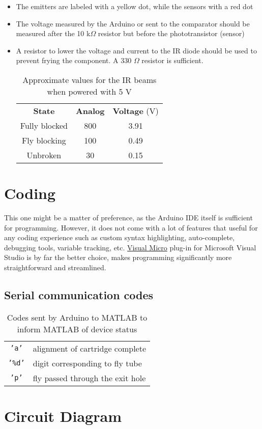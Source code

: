 \documentclass[12pt]{article}
\begin{document}
\begin{itemize}
	\item The emitters are labeled with a yellow dot, while the sensors with a red dot
	\item The voltage measured by the Arduino or sent to the comparator should be measured after the 10 k$\Omega$ resistor but before the phototransistor (sensor)
	\item A resistor to lower the voltage and current to the IR diode should be used to prevent frying the component. A 330 $\Omega$ resistor is sufficient.
	\begin{table}[H]
		\centering
		\begin{tabular}{c | c | c}
			\textbf{State} 	& \textbf{Analog} & \textbf{Voltage} (V) \\ \cline{1-3}
			Fully blocked 	& 800  & 3.91\\
			Fly blocking	& 100  & 0.49\\
			Unbroken 		& 30   & 0.15\\ 
		\end{tabular}
		\caption{Approximate values for the IR beams when powered with 5 V}
		\label{tbl:irstates}
	\end{table}
\end{itemize}

\section{Coding}
This one might be a matter of preference, as the Arduino IDE itself is sufficient for programming. However, it does not come with a lot of features that useful for any coding experience such as custom syntax highlighting, auto-complete, debugging tools, variable tracking, etc. \href{https://www.visualmicro.com/}{Visual Micro} plug-in for Microsoft Visual Studio is by far the better choice, makes programming significantly more straightforward and streamlined.

\subsection{Serial communication codes}
\begin{table}[H]
	\centering
	\begin{tabular}{c l}
		\texttt{'a'}  & alignment of cartridge complete\\
		\texttt{'\%d'} & digit corresponding to fly tube\\
		\texttt{'p'} & fly passed through the exit hole
	\end{tabular}
	\caption{Codes sent by Arduino to MATLAB to inform MATLAB of device status}
	\label{tbl:arduino_codes}
\end{table}

\section{Circuit Diagram}

\end{document}
